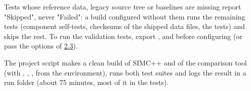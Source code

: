 Tests whose reference data, legacy source tree or baselines are missing report "Skipped", never "Failed": a build
configured without them runs the remaining tests (component self-tests, checksums of the shipped data files, the 
tests) and skips the rest. To run the validation tests, export ,  and  before
configuring (or pass the  options of \hyperref[user_manual-02u5finstallation:23-building]{2.3}).

The project script  makes a clean build of SIMC++ and of the comparison
tool (with , , ,  from the environment),\allowbreak{} runs both test suites and logs the result in a run folder (about 75 minutes, most of it in the
 tests).

